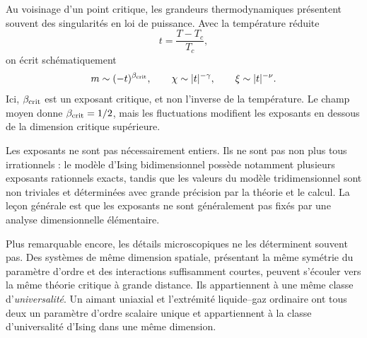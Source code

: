 Au voisinage d’un point critique, les grandeurs thermodynamiques présentent souvent des singularités en loi de puissance. Avec la température réduite
\begin{equation}
t=\frac{T-T_c}{T_c},
\end{equation}
on écrit schématiquement
\begin{equation}
m\sim(-t)^{\beta_{\rm crit}},
\qquad
\chi\sim |t|^{-\gamma},
\qquad
\xi\sim |t|^{-\nu}.
\label{eq:critical-exponents}
\end{equation}
Ici, \(\beta_{\rm crit}\) est un exposant critique, et non l’inverse de la température. Le champ moyen donne \(\beta_{\rm crit}=1/2\), mais les fluctuations modifient les exposants en dessous de la dimension critique supérieure.

Les exposants ne sont pas nécessairement entiers. Ils ne sont pas non plus tous irrationnels : le modèle d’Ising bidimensionnel possède notamment plusieurs exposants rationnels exacts, tandis que les valeurs du modèle tridimensionnel sont non triviales et déterminées avec grande précision par la théorie et le calcul. La leçon générale est que les exposants ne sont généralement pas fixés par une analyse dimensionnelle élémentaire.

Plus remarquable encore, les détails microscopiques ne les déterminent souvent pas. Des systèmes de même dimension spatiale, présentant la même symétrie du paramètre d’ordre et des interactions suffisamment courtes, peuvent s’écouler vers la même théorie critique à grande distance. Ils appartiennent à une même classe d’\emph{universalité}. Un aimant uniaxial et l’extrémité liquide--gaz ordinaire ont tous deux un paramètre d’ordre scalaire unique et appartiennent à la classe d’universalité d’Ising dans une même dimension.

\begin{classroomqa}
\end{classroomqa}


